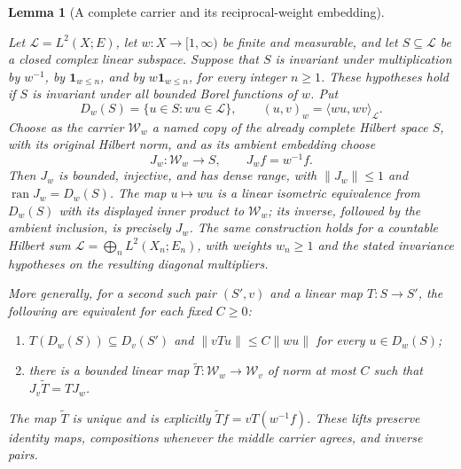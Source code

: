 \documentclass[11pt,a4paper]{article}
\newtheorem{lemma}[theorem]{Lemma}
\theoremstyle{definition}
\theoremstyle{remark}
\newcommand{\proofid}[1]{\par\smallskip{\normalfont\scriptsize\color{inkblue}Stable ID: \nolinkurl{#1}}\par\smallskip}
\begin{document}
\begin{lemma}[A complete carrier and its reciprocal-weight embedding]
\label{basic:weighted-carrier}
\proofid{basic:weighted-carrier}
\par{}\par\smallskip

Let $\mathcal L=L^2(X;E)$, let $w:X\to[1,\infty)$ be finite
and measurable, and let $S\subseteq\mathcal L$ be a closed complex
linear subspace. Suppose that $S$ is invariant under multiplication
by $w^{-1}$, by $\mathbf1_{w\leq n}$, and by
$w\mathbf1_{w\leq n}$, for every integer $n\geq1$.
These hypotheses hold if $S$ is invariant under all bounded Borel
functions of $w$. Put
\[
 D_w(S)=\{u\in S:wu\in\mathcal L\},\qquad
 (u,v)_w=\langle wu,wv\rangle_{\mathcal L}.
\]
Choose as the \emph{carrier} $\mathcal W_w$ a named copy of the
already complete Hilbert space $S$, with its original Hilbert norm,
and as its ambient embedding choose
\[
 J_w:\mathcal W_w\longrightarrow S,\qquad J_wf=w^{-1}f.
\]
Then $J_w$ is bounded, injective, and has dense range, with
$\|J_w\|\leq1$ and $\operatorname{ran}J_w=D_w(S)$.
The map $u\mapsto wu$ is a linear isometric equivalence from
$D_w(S)$ with its displayed inner product to $\mathcal W_w$;
its inverse, followed by the ambient inclusion, is precisely $J_w$.
The same construction holds for a countable Hilbert sum
$\mathcal L=\bigoplus_nL^2(X_n;E_n)$, with weights $w_n\geq1$
and the stated invariance hypotheses on the resulting diagonal
multipliers.

More generally, for a second such pair $(S',v)$ and a linear map
$T:S\to S'$, the following are equivalent for each fixed $C\geq0$:
\begin{enumerate}
\item $T(D_w(S))\subseteq D_v(S')$ and
$\|vTu\|\leq C\|wu\|$ for every $u\in D_w(S)$;
\item there is a bounded linear map
$\widetilde T:\mathcal W_w\to\mathcal W_v$ of norm at most $C$
such that $J_v\widetilde T=TJ_w$.
\end{enumerate}
The map $\widetilde T$ is unique and is explicitly
$\widetilde Tf=vT(w^{-1}f)$. These lifts preserve identity maps,
compositions whenever the middle carrier agrees, and inverse pairs.
\end{lemma}
\end{document}
